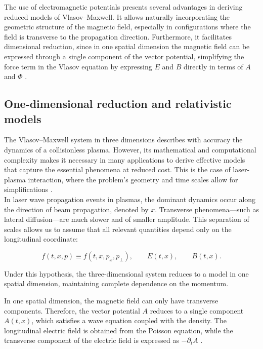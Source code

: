 \documentclass[11pt,a4paper,twoside,pdf]{article}
\numberwithin{equation}{section}
\begin{document}
The use of electromagnetic potentials presents several advantages in deriving reduced models of Vlasov--Maxwell. It allows naturally incorporating the geometric structure of the magnetic field, especially in configurations where the field is transverse to the propagation direction. Furthermore, it facilitates dimensional reduction, since in one spatial dimension the magnetic field can be expressed through a single component of the vector potential, simplifying the force term in the Vlasov equation by expressing $E$ and $B$ directly in terms of $A$ and $\Phi$ \cite{carrillo2006global}.







\subsection{One-dimensional reduction and relativistic models}

The Vlasov--Maxwell system in three dimensions describes with accuracy the dynamics of a collisionless plasma. However, its mathematical and computational complexity makes it necessary in many applications to derive effective models that capture the essential phenomena at reduced cost. This is the case of laser-plasma interaction, where the problem's geometry and time scales allow for simplifications \cite{ghizzo1990vlasov}.\\



In laser wave propagation events in plasmas, the dominant dynamics occur along the direction of beam propagation, denoted by $x$. Transverse phenomena—such as lateral diffusion—are much slower and of smaller amplitude. This separation of scales allows us to assume that all relevant quantities depend only on the longitudinal coordinate:


\[
f(t,x,p) \equiv f(t,x,p_x,p_\perp), \qquad
E(t,x), \qquad B(t,x).
\]


Under this hypothesis, the three-dimensional system reduces to a model in one spatial dimension, maintaining complete dependence on the momentum.



In one spatial dimension, the magnetic field can only have transverse components. Therefore, the vector potential $A$ reduces to a single component $A(t,x)$, which satisfies a wave equation coupled with the density. The longitudinal electric field is obtained from the Poisson equation, while the transverse component of the electric field is expressed as $-\partial_t A$ \cite{martin2021campo}.\\
\end{document}
